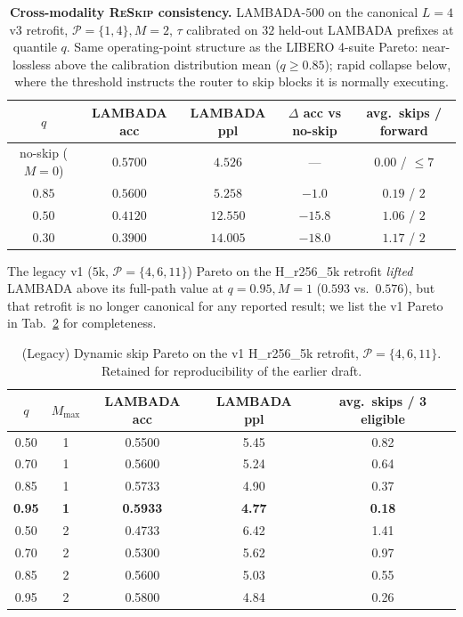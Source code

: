 \documentclass{article}
\newcommand{\reskip}{\textsc{ReSkip}}
\begin{document}
\begin{table}[h]
\caption{\textbf{Cross-modality \reskip{} consistency.} LAMBADA-$500$ on the canonical $L{=}4$ v3 retrofit, $\mathcal{P}{=}\{1,4\}, M{=}2$, $\tau$ calibrated on $32$ held-out LAMBADA prefixes at quantile $q$. Same operating-point structure as the LIBERO 4-suite Pareto: near-lossless above the calibration distribution mean ($q{\geq}0.85$); rapid collapse below, where the threshold instructs the router to skip blocks it is normally executing.}
\label{tab:retrofit_pareto}
\centering\small
\begin{tabular}{ccccc}
\toprule
$q$ & LAMBADA acc & LAMBADA ppl & $\Delta$ acc vs no-skip & avg.\ skips / forward \\
\midrule
no-skip ($M{=}0$) & $0.5700$ & $4.526$ & --- & $0.00$ / $\le 7$ \\
$0.85$ & $0.5600$ & $5.258$ & $-1.0$ & $0.19$ / $2$ \\
$0.50$ & $0.4120$ & $12.550$ & $-15.8$ & $1.06$ / $2$ \\
$0.30$ & $0.3900$ & $14.005$ & $-18.0$ & $1.17$ / $2$ \\
\bottomrule
\end{tabular}
\end{table}

The legacy v1 ($5$k, $\mathcal{P}{=}\{4,6,11\}$) Pareto on the H\_r256\_5k retrofit \emph{lifted} LAMBADA above its full-path value at $q{=}0.95, M{=}1$ ($0.593$ vs.\ $0.576$), but that retrofit is no longer canonical for any reported result; we list the v1 Pareto in Tab.~\ref{tab:retrofit_pareto_v1_legacy} for completeness.

\begin{table}[h]
\caption{(Legacy) Dynamic skip Pareto on the v1 H\_r256\_5k retrofit, $\mathcal{P}{=}\{4,6,11\}$. Retained for reproducibility of the earlier draft.}
\label{tab:retrofit_pareto_v1_legacy}
\centering\small
\begin{tabular}{ccccc}
\toprule
$q$ & $M_{\max}$ & LAMBADA acc & LAMBADA ppl & avg.\ skips / 3 eligible \\
\midrule
0.50 & 1 & 0.5500 & 5.45 & 0.82 \\
0.70 & 1 & 0.5600 & 5.24 & 0.64 \\
0.85 & 1 & 0.5733 & 4.90 & 0.37 \\
\textbf{0.95} & \textbf{1} & \textbf{0.5933} & \textbf{4.77} & \textbf{0.18} \\
0.50 & 2 & 0.4733 & 6.42 & 1.41 \\
0.70 & 2 & 0.5300 & 5.62 & 0.97 \\
0.85 & 2 & 0.5600 & 5.03 & 0.55 \\
0.95 & 2 & 0.5800 & 4.84 & 0.26 \\
\bottomrule
\end{tabular}
\end{table}
\end{document}
